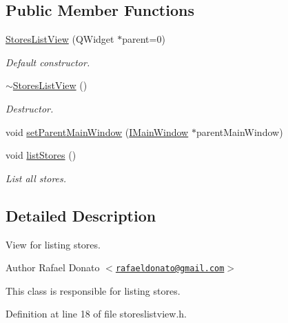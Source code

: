 \subsection*{\-Public \-Member \-Functions}
\begin{DoxyCompactItemize}
\item 
\hyperlink{class_stores_list_view_ac14227c03b1185bd174edcd4d2551c4c}{\-Stores\-List\-View} (\-Q\-Widget $\ast$parent=0)
\begin{DoxyCompactList}\small\item\em \-Default constructor. \end{DoxyCompactList}\item 
\hyperlink{class_stores_list_view_ac8a0eb0eb9eb08cf6ffef202a11f03f6}{$\sim$\-Stores\-List\-View} ()
\begin{DoxyCompactList}\small\item\em \-Destructor. \end{DoxyCompactList}\item 
void \hyperlink{class_stores_list_view_a34e59bf2c028f2e1180056aed411c851}{set\-Parent\-Main\-Window} (\hyperlink{class_i_main_window}{\-I\-Main\-Window} $\ast$parent\-Main\-Window)
\item 
void \hyperlink{class_stores_list_view_afabc011bb0c5af45611f8f97e0b8dd63}{list\-Stores} ()
\begin{DoxyCompactList}\small\item\em \-List all stores. \end{DoxyCompactList}\end{DoxyCompactItemize}


\subsection{\-Detailed \-Description}
\-View for listing stores. 

\begin{DoxyAuthor}{\-Author}
\-Rafael \-Donato $<$\href{mailto:rafaeldonato@gmail.com}{\tt rafaeldonato@gmail.\-com}$>$
\end{DoxyAuthor}
\-This class is responsible for listing stores. 

\-Definition at line 18 of file storeslistview.\-h.



